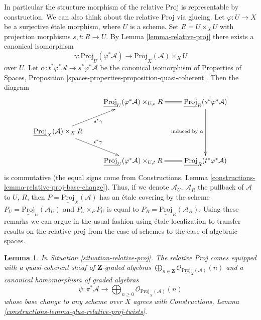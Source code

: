 \documentclass{stacks-project}
\theoremstyle{plain}
\newtheorem{lemma}[subsection]{Lemma}
\theoremstyle{definition}
\theoremstyle{remark}
\numberwithin{equation}{subsection}
\begin{document}
\noindent
In particular the structure morphism of the relative Proj is representable
by construction. We can also think about the relative Proj via glueing. Let
$\varphi : U \to X$ be a surjective \'etale morphism, where $U$ is a scheme.
Set $R = U \times_X U$ with projection morphisms $s, t : R  \to U$.
By Lemma \ref{lemma-relative-proj} there exists a canonical isomorphism
$$
\gamma : 
\underline{\text{Proj}}_U(\varphi^*\mathcal{A})
\longrightarrow
\underline{\text{Proj}}_X(\mathcal{A}) \times_X U
$$
over $U$. Let $\alpha : t^*\varphi^*\mathcal{A} \to s^*\varphi^*\mathcal{A}$
be the canonical isomorphism of
Properties of Spaces, Proposition
\ref{spaces-properties-proposition-quasi-coherent}.
Then the diagram
$$
\xymatrix{
&
\underline{\text{Proj}}_U(\varphi^*\mathcal{A}) \times_{U, s} R
\ar@{=}[r] &
\underline{\text{Proj}}_R(s^*\varphi^*\mathcal{A})
\ar[dd]_{\text{induced by }\alpha} \\
\underline{\text{Proj}}_X(\mathcal{A}) \times_X R
\ar[ru]_{s^*\gamma} \ar[rd]^{t^*\gamma} \\
&
\underline{\text{Proj}}_U(\varphi^*\mathcal{A}) \times_{U, t} R
\ar@{=}[r] &
\underline{\text{Proj}}_R(t^*\varphi^*\mathcal{A})
}
$$
is commutative (the equal signs come from
Constructions, Lemma \ref{constructions-lemma-relative-proj-base-change}).
Thus, if we denote $\mathcal{A}_U$, $\mathcal{A}_R$
the pullback of $\mathcal{A}$ to $U$, $R$, then
$P = \underline{\text{Proj}}_X(\mathcal{A})$ has an \'etale covering
by the scheme $P_U = \underline{\text{Proj}}_U(\mathcal{A}_U)$ and
$P_U \times_P P_U$ is equal to
$P_R = \underline{\text{Proj}}_R(\mathcal{A}_R)$.
Using these remarks we can argue in the usual fashion using \'etale
localization to transfer results on the relative proj from the case
of schemes to the case of algebraic spaces.

\begin{lemma}
\label{lemma-twists-of-structure-sheaf}
In Situation \ref{situation-relative-proj}. The relative Proj comes
equipped with a quasi-coherent sheaf of $\mathbf{Z}$-graded algebras
$\bigoplus_{n \in \mathbf{Z}}
\mathcal{O}_{\underline{\text{Proj}}_X(\mathcal{A})}(n)$
and a canonical homomorphism of graded algebras
$$
\psi :
\pi^*\mathcal{A}
\longrightarrow
\bigoplus\nolimits_{n \geq 0}
\mathcal{O}_{\underline{\text{Proj}}_X(\mathcal{A})}(n)
$$
whose base change to any scheme over $X$ agrees with
Constructions, Lemma \ref{constructions-lemma-glue-relative-proj-twists}.
\end{lemma}
\end{document}
